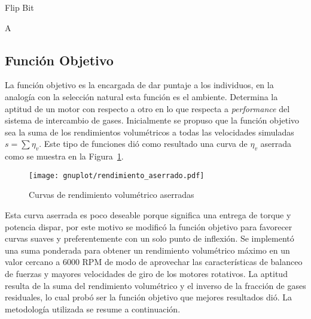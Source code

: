 \begin{algorithm}
  \caption{Flip Bit}\label{algo:flipbit}
  \DontPrintSemicolon

    \Return A\;
\end{algorithm}

\subsection{Función Objetivo}\label{sec:funcion_objetivo}
%
La función objetivo es la encargada de dar puntaje a los individuos, en la
analogía con la selección natural esta función es el ambiente.
%
Determina la aptitud de un motor con respecto a otro en lo que respecta a
\emph{performance} del sistema de intercambio de gases.
%
Inicialmente se propuso que la función objetivo sea la suma de los rendimientos
volumétricos a todas las velocidades simuladas $s=\sum \eta_{v}$.
%
Este tipo de funciones dió como resultado una curva de $\eta_{v}$ aserrada como
se muestra en la Figura~\ref{fig:curva_aserrada}.

\begin{figure}[h!]
  \centering
  \texttt{[image: gnuplot/rendimiento\_aserrado.pdf]}
  \caption{Curvas de rendimiento volumétrico aserradas}\label{fig:curva_aserrada}
\end{figure}

Esta curva aserrada es poco deseable porque significa una entrega de torque y
potencia dispar, por este motivo se modificó la función objetivo para favorecer
curvas suaves y preferentemente con un solo punto de inflexión.
%
Se implementó una suma ponderada para obtener un rendimiento volumétrico máximo
en un valor cercano a 6000 RPM de modo de aprovechar las características de
balanceo de fuerzas y mayores velocidades de giro de los motores rotativos.
%
La aptitud resulta de la suma del rendimiento volumétrico y el inverso de la
fracción de gases residuales, lo cual probó ser la función objetivo que mejores
resultados dió.
La metodología utilizada se resume a continuación.

